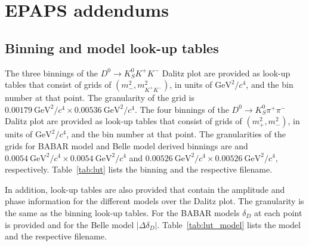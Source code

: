 \documentclass[aps,prd,superscriptaddress,nopreprintnumbers,nofootinbib,showpacs,floatfix]{revtex4}
\begin{document}
\section{EPAPS addendums}
\subsection{Binning and model look-up tables}
The three binnings of the $D^{0}\to K^{0}_{S}K^{+}K^{-}$ Dalitz plot are provided as look-up tables that 
consist of grids of $(m^2_{-},m^{2}_{K^{+}K^{-}})$, in units of $\mathrm{GeV^2}/c^{4}$, and the bin number at that %
point. The granularity of the grid is $0.00179~\mathrm{GeV^2}/c^{4}\times 0.00536~\mathrm{GeV^2}/c^{4}$.
The four binnings of the $D^{0}\to K^{0}_{S}\pi^{+}\pi^{-}$ Dalitz plot are provided as look-up tables that consist %
of grids of $(m^2_{+},m^{2}_{-})$, in units of $\mathrm{GeV^2}/c^{4}$, and the bin number at that point. The %
granularities of the grids for BABAR model and Belle model derived binnings are and %
$0.0054~\mathrm{GeV^2}/c^{4}\times 0.0054~\mathrm{GeV^2}/c^{4}$ and $0.00526~\mathrm{GeV^2}/c^{4}\times %
0.00526~\mathrm{GeV^2}/c^{4}$, respectively. Table~\ref{tab:lut} lists the binning and the respective filename. 

In addition, look-up tables are also provided that contain the amplitude and phase information for the different %
models over the Dalitz plot. The granularity is the same as the binning look-up tables. For the BABAR models %
$\delta_D$ at each point is provided and for the Belle model $|\Delta\delta_D|$. Table~\ref{tab:lut_model} lists %
the model and the respective filename.
\end{document}
